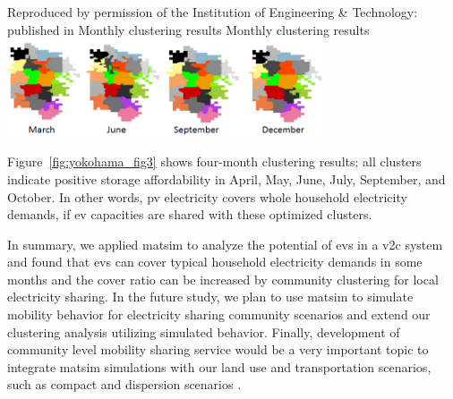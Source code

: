 {Reproduced by permission of the Institution of Engineering \& Technology: published in \citet[][Figure~10.a]{YamagataSeya_ITSIET_2015}}
%
\createfigure%
{Monthly clustering results}%
{Monthly clustering results}%
{\label{fig:yokohama_fig3}}%
{\includegraphics[width=0.7\textwidth, angle=0]{./scenarios/figures/yokohama_fig3.png}}%
{}

Figure~\ref{fig:yokohama_fig3} shows four-month clustering results; all clusters indicate positive storage affordability in April, May, June, July, September, and October. In other words, \gls{pv} electricity covers whole household electricity demands, if \gls{ev} capacities are shared with these optimized clusters.

In summary, we applied \gls{matsim} to analyze the potential of \glspl{ev} in a \gls{v2c} system and found that \glspl{ev} can cover typical household electricity demands in some months and the cover ratio can be increased by community clustering for local electricity sharing. In the future study, we plan to use \gls{matsim} to simulate mobility behavior for electricity sharing community scenarios and extend our clustering analysis utilizing simulated behavior. Finally, development of community level mobility sharing service would be a very important topic to integrate \gls{matsim} simulations with our land use and transportation scenarios, such as compact and dispersion scenarios \citep[see][]{YamagataEtAl_AoG_2013}.

